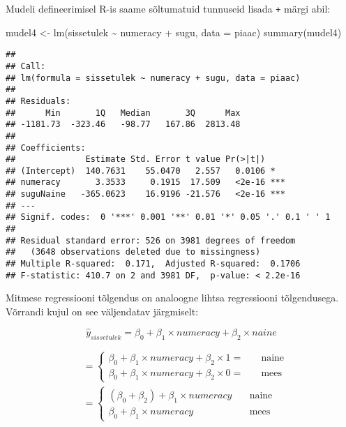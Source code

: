 \documentclass[
]{book}
\newenvironment{Shaded}{\begin{snugshade}}{\end{snugshade}}
\newcommand{\AttributeTok}[1]{\textcolor[rgb]{0.77,0.63,0.00}{#1}}
\newcommand{\FunctionTok}[1]{\textcolor[rgb]{0.00,0.00,0.00}{#1}}
\newcommand{\NormalTok}[1]{#1}
\newcommand{\OtherTok}[1]{\textcolor[rgb]{0.56,0.35,0.01}{#1}}
\newcommand{\SpecialCharTok}[1]{\textcolor[rgb]{0.00,0.00,0.00}{#1}}
\begin{document}
Mudeli defineerimisel R-is saame sõltumatuid tunnuseid lisada \texttt{+} märgi abil:

\begin{Shaded}
\begin{Highlighting}[]
\NormalTok{mudel4 }\OtherTok{\textless{}{-}} \FunctionTok{lm}\NormalTok{(sissetulek }\SpecialCharTok{\textasciitilde{}}\NormalTok{ numeracy }\SpecialCharTok{+}\NormalTok{ sugu, }\AttributeTok{data =}\NormalTok{ piaac)}
\FunctionTok{summary}\NormalTok{(mudel4)}
\end{Highlighting}
\end{Shaded}

\begin{verbatim}
## 
## Call:
## lm(formula = sissetulek ~ numeracy + sugu, data = piaac)
## 
## Residuals:
##      Min       1Q   Median       3Q      Max 
## -1181.73  -323.46   -98.77   167.86  2813.48 
## 
## Coefficients:
##              Estimate Std. Error t value Pr(>|t|)    
## (Intercept)  140.7631    55.0470   2.557   0.0106 *  
## numeracy       3.3533     0.1915  17.509   <2e-16 ***
## suguNaine   -365.0623    16.9196 -21.576   <2e-16 ***
## ---
## Signif. codes:  0 '***' 0.001 '**' 0.01 '*' 0.05 '.' 0.1 ' ' 1
## 
## Residual standard error: 526 on 3981 degrees of freedom
##   (3648 observations deleted due to missingness)
## Multiple R-squared:  0.171,  Adjusted R-squared:  0.1706 
## F-statistic: 410.7 on 2 and 3981 DF,  p-value: < 2.2e-16
\end{verbatim}

Mitmese regressiooni tõlgendus on analoogne lihtsa regressiooni tõlgendusega. Võrrandi kujul on see väljendatav järgmiselt:

\[\hat{y}_{sissetulek}=\beta_0+\beta_1 \times numeracy + \beta_2 \times naine\]

\begin{align}
&=
  \begin{cases}
    \beta_0+\beta_1 \times numeracy + \beta_2 \times 1 =  & \quad \text{naine}\\
    \beta_0+\beta_1 \times numeracy + \beta_2 \times 0 =  & \quad \text{mees}
  \end{cases}\\
&=
  \begin{cases}
    (\beta_0+\beta_2)+\beta_1 \times numeracy  & \quad \text{naine}\\
    \beta_0+\beta_1 \times numeracy & \quad \text{mees}
  \end{cases}\\
\end{align}
\end{document}
